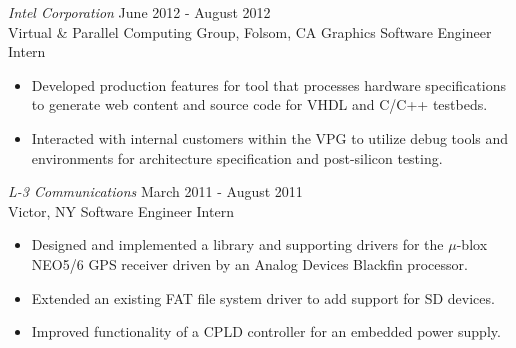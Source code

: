 \documentclass[10pt]{res}
\begin{document}
\begin{resume}
{\sl Intel Corporation} \hfill June 2012 - August 2012 \\
Virtual \& Parallel Computing Group, Folsom, CA \hfill Graphics Software Engineer Intern
\begin{itemize} \itemsep -2pt %
\item Developed production features for tool that processes hardware specifications to generate web content and source code for VHDL and C/C++ testbeds.
\item Interacted with internal customers within the VPG to utilize debug tools and environments for architecture specification and post-silicon testing.
\end{itemize}

{\sl L-3 Communications} \hfill March 2011 - August 2011 \\
Victor, NY \hfill Software Engineer Intern
\begin{itemize} \itemsep -2pt %
\item Designed and implemented a library and supporting drivers for the $\mu$-blox NEO5/6 GPS receiver driven by an Analog Devices Blackfin processor.
\item Extended an existing FAT file system driver to add support for SD devices.
\item Improved functionality of a CPLD controller for an embedded power supply.
\end{itemize}




\end{resume}
\end{document}
